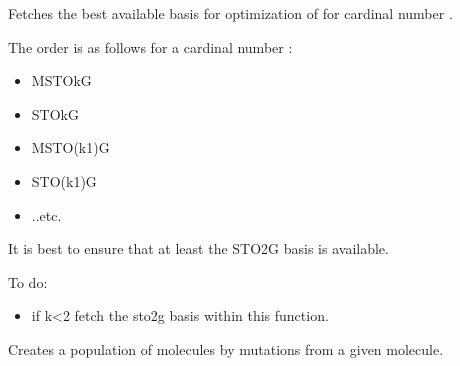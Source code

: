 \documentclass[letterpaper,10pt,english]{sphinxmanual}
\begin{document}

\begin{fulllineitems}
\label{\detokenize{api:MSTOOptpar.FetchBestMol}}
\pysigstartsignatures
\pysiglinewithargsret
{}
{\sphinxparamcomma {}\sphinxparamcomma {}}
{}
\pysigstopsignatures
\sphinxAtStartPar
Fetches the best available basis for optimization of  for cardinal number .

\sphinxAtStartPar
The order is as follows for a cardinal number :
\begin{itemize}
\item {} 
\sphinxAtStartPar
MSTO\sphinxhyphen{}kG

\item {} 
\sphinxAtStartPar
STO\sphinxhyphen{}kG

\item {} 
\sphinxAtStartPar
MSTO\sphinxhyphen{}(k\sphinxhyphen{}1)G

\item {} 
\sphinxAtStartPar
STO\sphinxhyphen{}(k\sphinxhyphen{}1)G

\item {} 
\sphinxAtStartPar
..etc.

\end{itemize}

\sphinxAtStartPar
It is best to ensure that at least the STO\sphinxhyphen{}2G basis is available.

\sphinxAtStartPar
To do:
\begin{itemize}
\item {} 
\sphinxAtStartPar
if k\textless{}2 fetch the sto\sphinxhyphen{}2g basis within this function.

\end{itemize}

\end{fulllineitems}


\begin{fulllineitems}
\label{\detokenize{api:MSTOOptpar.GenerateInitialPopulation}}
\pysigstartsignatures
\pysiglinewithargsret
{}
{\sphinxparamcomma {}\sphinxparamcomma {}}
{}
\pysigstopsignatures
\sphinxAtStartPar
Creates a population of molecules by mutations from a given molecule.

\end{fulllineitems}
\end{document}

